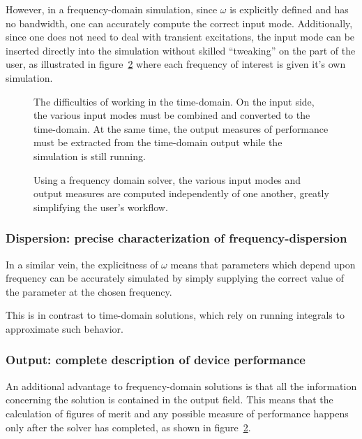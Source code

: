 \documentclass{article}
\newcommand{\fig}[1]{figure~\ref{fig:#1}}
\begin{document}
However, in a frequency-domain simulation, 
    since $\omega$ is explicitly defined and has no bandwidth,
    one can accurately compute the correct input mode.
Additionally, since one does not need to deal with transient excitations,
    the input mode can be inserted directly into the simulation
    without skilled ``tweaking'' on the part of the user,
    as illustrated in \fig{frequency domain diagram}
    where each frequency of interest is given it's own simulation.
 
\begin{figure}[ht]\begin{center}

\caption{The difficulties of working in the time-domain.
        On the input side, the various input modes must be
            combined and converted to the time-domain.
        At the same time, the output measures of performance 
            must be extracted from the time-domain output
            while the simulation is still running.}
\label{fig:time domain diagram}
\end{center} \end{figure}

\begin{figure}[ht]\begin{center}

\caption{Using a frequency domain solver,
            the various input modes and output measures
            are computed independently of one another,
            greatly simplifying the user's workflow.}
\label{fig:frequency domain diagram}
\end{center} \end{figure}

\subsubsection{Dispersion: precise characterization of frequency-dispersion}
In a similar vein, the explicitness of $\omega$ means that
    parameters which depend upon frequency can be accurately simulated
    by simply supplying the correct value of the parameter at the 
    chosen frequency.

This is in contrast to time-domain solutions,
    which rely on running integrals to approximate such behavior.
    
\subsubsection{Output: complete description of device performance}
An additional advantage to frequency-domain solutions
    is that all the information concerning the solution
    is contained in the output field.
This means that the calculation of figures of merit and 
    any possible measure of performance happens only
    after the solver has completed, 
    as shown in \fig{frequency domain diagram}.
\end{document}
